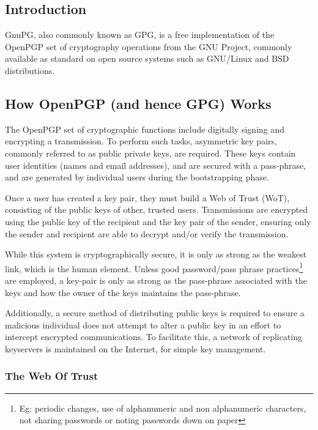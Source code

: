 
\subsection{Introduction}

GnuPG, also commonly known as GPG, is a free implementation of the
OpenPGP set of cryptography operations from the GNU Project, commonly
available as standard on open source systems such as GNU/Linux and BSD 
distributions.

\subsection{How OpenPGP (and hence GPG) Works}

The OpenPGP set of cryptographic functions include digitally signing and
encrypting a transmission. To perform such tasks, asymmetric key pairs,
commonly referred to as public private keys, are required. These keys
contain user identities (names and email addresses), and are secured 
with a pass-phrase, and are generated by individual users during the 
bootstrapping phase.


Once a user has created a key pair, they must build a Web of Trust 
(WoT), consisting of the public keys of other, trusted users.
Transmissions are encrypted using the public key of the recipient and
the key pair of the sender, ensuring only the sender and recipient are
able to decrypt and/or verify the transmission.


While this system is cryptographically secure, it is only as strong as
the weakest link, which is the human element. Unless 
good password/pass phrase practices\footnote{Eg: periodic changes, use 
of alphanumeric and non alphanumeric characters, not sharing passwords 
or noting passwords down on paper} are employed, a key-pair is only as 
strong as the pass-phrase associated with the keys and how the owner of 
the keys maintains the pass-phrase.


Additionally, a secure method of distributing public keys is required to
ensure a malicious individual does not attempt to alter a public key in
an effort to intercept encrypted communications. To facilitate this, a
network of replicating keyservers is maintained on the Internet, for
simple key management.

\pagebreak 

\subsubsection{The Web Of Trust}

